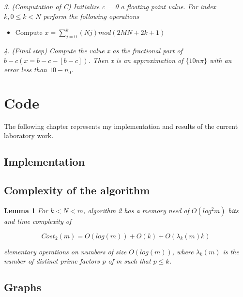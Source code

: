 \documentclass[a4paper, 12pt]{article}
\begin{document}
\textit{3. (Computation of C) Initialize c = 0 a floating point value. For index $k, 0 \leq k < N$ perform
    the following operations}

\begin{itemize}
    \item Compute $x = \sum_{j=0}^k (N j) mod (2MN + 2k + 1)$
\end{itemize}

\textit{4. (Final step) Compute the value x as the fractional part of $b - c (x = b - c - [b - c])$. Then
x is an approximation of $\{10n\pi\}$ with an error less than $10-n_0$.
}

\newpage

\section{Code}

The following chapter represents my implementation and results of the current laboratory work.

\subsection{Implementation}



\subsection{Complexity of the algorithm}

\textbf{Lemma 1} \textit{For $k < N < m$, algorithm 2 has a memory need of $O(log^2m)$ bits and time complexity of}

$$
    Cost_2(m) = O(log(m)) + O(k) + O(\lambda_k(m)k)
$$

\textit{elementary operations on numbers of size $O(log(m))$, where $\lambda_k(m)$ is the number of distinct prime factors p of m such that $p \leq k$.}

\subsection{Graphs}
\end{document}

